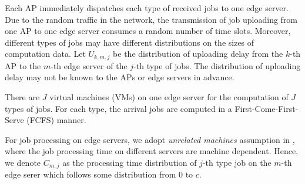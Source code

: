Each AP immediately dispatches each type of received jobs to one edge server.
Due to the random traffic in the network, the transmission of job uploading from one AP to one edge server consumes a random number of time slots. Moreover, different types of jobs may have different distributions on the sizes of computation data.
Let $U_{k,m,j}$ be the distribution of uploading delay from the $k$-th AP to the $m$-th edge server of the $j$-th type of jobs.
The distribution of uploading delay  may not be known to the APs or edge servers in advance.

There are $J$ virtual machines (VMs) on one edge server for the computation of $J$ types of jobs.
For each type, the arrival jobs are computed in a First-Come-First-Serve (FCFS) manner.

For job processing on edge servers, we adopt \emph{unrelated machines} assumption in \cite{tan-online}, where the job processing time on different servers are machine dependent. %
Hence, we denote $C_{m,j}$ as the processing time distribution of $j$-th type job on the $m$-th edge serer which follows some distribution from $0$ to $c$.

